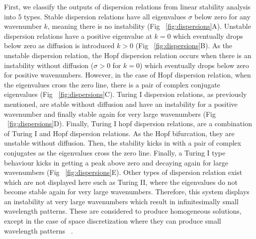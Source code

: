 First, we classify the outputs of dispersion relations from linear stability analysis into 5 types.
Stable dispersion relations have all eigenvalues $\sigma$ below zero for any wavenumber $k$, meaning there is no instability (Fig ~\ref{fig:dispersions}A).
Unstable dispersion relations have a positive eigenvalue at $k=0$ which eventually drops below zero as diffusion is introduced $k>0$ (Fig ~\ref{fig:dispersions}B).
As the unstable dispersion relation, the Hopf dispersion relation occurs when there is an instability without diffusion ($\sigma>0$ for $k=0$) which eventually drops below zero for positive wavenumbers.
However, in the case of Hopf dispersion relation, when the eigenvalues cross the zero line, there is a pair of complex conjugate eigenvalues (Fig ~\ref{fig:dispersions}C).
Turing I dispersion relations, as previously mentioned, are stable without diffusion and have an instability for a positive wavenumber and finally stable again for very large wavenumbers (Fig ~\ref{fig:dispersions}D).
Finally, Turing I hopf dispersion relations, are a combination of Turing I and Hopf dispersion relations.
As the Hopf bifurcation, they are unstable without diffusion.
Then, the stability kicks in with a pair of complex conjugates as the eigenvalues cross the zero line.
Finally, a Turing I type behaviour kicks in getting a peak above zero and decaying again for large wavenumbers (Fig ~\ref{fig:dispersions}E).
Other types of dispersion relation exist which are not displayed here such as Turing II, where the eigenvalues do not become stable again for very large wavenumbers.
Therefore, this system displays an instability at very large wavenumbers which result in infinitesimally small wavelength patterns.
These are considered to produce homogeneous solutions, except in the case of space discretization where they can produce small wavelength patterns ~\parencite{Wang2022}.





